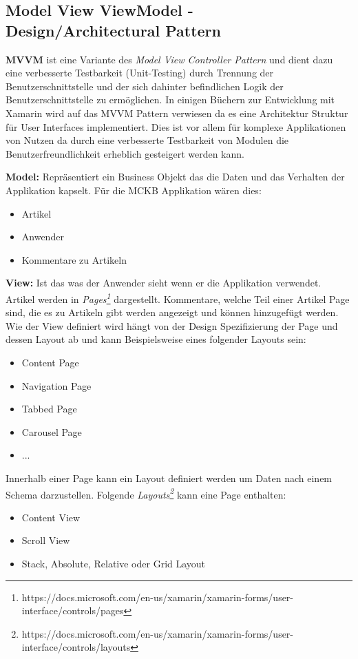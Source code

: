 \subsection{Model View ViewModel - Design/Architectural Pattern}
\label{sec:xamarinformsmvvm}
	
	\textbf{MVVM} ist eine Variante des \textit{Model View Controller Pattern} und dient dazu eine verbesserte Testbarkeit (Unit-Testing) durch Trennung der Benutzerschnittstelle und der sich dahinter befindlichen Logik der Benutzerschnittstelle zu ermöglichen. In einigen Büchern zur Entwicklung mit Xamarin wird auf das MVVM Pattern verwiesen da es eine Architektur Struktur für User Interfaces implementiert\cite{book:Xamarin.Forms-Essentials:}. Dies ist vor allem für komplexe Applikationen von Nutzen da durch eine verbesserte Testbarkeit von Modulen die Benutzerfreundlichkeit erheblich gesteigert werden kann.

	\textbf{Model:} Repräsentiert ein Business Objekt das die Daten und das Verhalten der Applikation kapselt. Für die MCKB Applikation wären dies:
	\begin{itemize}
		\setlength\itemsep{0em}
		\item Artikel
		\item Anwender
		\item Kommentare zu Artikeln
	\end{itemize}

	\textbf{View:} Ist das was der Anwender sieht wenn er die Applikation verwendet. Artikel werden in \textit{Pages\footnote{https://docs.microsoft.com/en-us/xamarin/xamarin-forms/user-interface/controls/pages}} dargestellt. Kommentare, welche Teil einer Artikel Page sind, die es zu Artikeln gibt werden angezeigt und können hinzugefügt werden. Wie der View definiert wird hängt von der Design Spezifizierung der Page und dessen Layout ab und kann Beispielsweise eines folgender Layouts sein:
	\begin{itemize}
		\setlength\itemsep{0em}
		\item Content Page
		\item Navigation Page
		\item Tabbed Page
		\item Carousel Page
		\item ...
	\end{itemize}
	Innerhalb einer Page kann ein Layout definiert werden um Daten nach einem Schema darzustellen. Folgende \textit{Layouts\footnote{https://docs.microsoft.com/en-us/xamarin/xamarin-forms/user-interface/controls/layouts}} kann eine Page enthalten:
	\begin{itemize}
		\setlength\itemsep{0em}
		\item Content View
		\item Scroll View
		\item Stack, Absolute, Relative oder Grid Layout
	\end{itemize}

